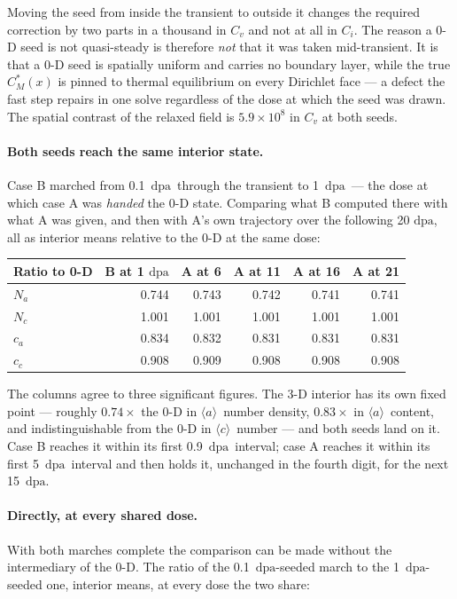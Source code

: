\documentclass[11pt,a4paper]{article}
\newcommand{\dpa}{\ensuremath{\mathrm{dpa}}}
\newcommand{\aloop}{\ensuremath{\langle a\rangle}}
\newcommand{\cloop}{\ensuremath{\langle c\rangle}}
\begin{document}
\noindent
Moving the seed from inside the transient to outside it changes the required
correction by two parts in a thousand in $C_v$ and not at all in $C_i$. The
reason a 0-D seed is not quasi-steady is therefore \emph{not} that it was taken
mid-transient. It is that a 0-D seed is spatially uniform and carries no
boundary layer, while the true $C_M^*(x)$ is pinned to thermal equilibrium on
every Dirichlet face --- a defect the fast step repairs in one solve regardless
of the dose at which the seed was drawn. The spatial contrast of the relaxed
field is $5.9\times10^{8}$ in $C_v$ at both seeds.

\paragraph{Both seeds reach the same interior state.} Case B marched from
0.1~\dpa\ through the transient to 1~\dpa\ --- the dose at which case A was
\emph{handed} the 0-D state. Comparing what B computed there with what A was
given, and then with A's own trajectory over the following 20 \dpa, all as
interior means relative to the 0-D at the same dose:

\begin{center}
\begin{tabular}{lrrrrr}
\toprule
Ratio to 0-D & B at 1 \dpa & A at 6 & A at 11 & A at 16 & A at 21 \\
\midrule
$N_a$ & 0.744 & 0.743 & 0.742 & 0.741 & 0.741 \\
$N_c$ & 1.001 & 1.001 & 1.001 & 1.001 & 1.001 \\
$c_a$ & 0.834 & 0.832 & 0.831 & 0.831 & 0.831 \\
$c_c$ & 0.908 & 0.909 & 0.908 & 0.908 & 0.908 \\
\bottomrule
\end{tabular}
\end{center}

\noindent
The columns agree to three significant figures. The 3-D interior has its own
fixed point --- roughly $0.74\times$ the 0-D in \aloop\ number density,
$0.83\times$ in \aloop\ content, and indistinguishable from the 0-D in \cloop\
number --- and both seeds land on it. Case B reaches it within its first
0.9~\dpa\ interval; case A reaches it within its first 5~\dpa\ interval and then
holds it, unchanged in the fourth digit, for the next 15~\dpa.

\paragraph{Directly, at every shared dose.} With both marches complete the
comparison can be made without the intermediary of the 0-D. The ratio of the
0.1~\dpa-seeded march to the 1~\dpa-seeded one, interior means, at every dose
the two share:
\end{document}
